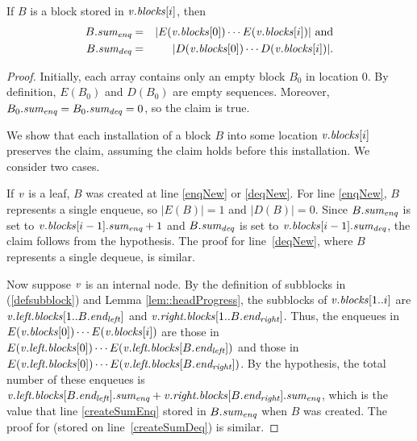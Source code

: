 \begin{invariant}
\label{inv::sum}
If $B$ is a block stored in $\var{v}.\fld{blocks}[i]$, then
\begin{eqnarray*}
B.\fld{sum\sub{enq}} &=& | E(\var{v}.\fld{blocks}[0])\cdots E(\var{v}.\fld{blocks}[i]) | \mbox{ and}\\
B.\fld{sum\sub{deq}} &=& | D(\var{v}.\fld{blocks}[0])\cdots D(\var{v}.\fld{blocks}[i]) |.
\end{eqnarray*}
\end{invariant}

\begin{proof}
Initially, each  array  contains only an empty block $B_0$ in location 0.
By definition, $E(B_0)$ and $D(B_0)$ are empty sequences.
Moreover, $B_0.\fld{sum\sub{enq}} = B_0.\fld{sum\sub{deq}} = 0$, so the claim is true.

We show that each installation of a block $B$ into some location $\var{v}.\fld{blocks}[i]$ preserves the claim,
assuming the claim holds before this installation.  We consider two cases.

If $\var{v}$ is a leaf, $B$ was created at line \ref{enqNew} or \ref{deqNew}.
For line \ref{enqNew}, $B$ represents a single enqueue, so $|E(B)|=1$ and $|D(B)|=0$.
Since $B.\fld{sum\sub{enq}}$ is set to $\var{v}.\fld{blocks}[i-1].\fld{sum\sub{enq}}+1$ and
$B.\fld{sum\sub{deq}}$ is set to $\var{v}.\fld{blocks}[i-1].\fld{sum\sub{deq}}$, the claim follows from the hypothesis.
The proof for line~\ref{deqNew}, where $B$ represents a single dequeue, is similar.

Now suppose $\var{v}$ is an internal node. By the definition of  subblocks in (\ref{defsubblock}) and Lemma \ref{lem::headProgress}, the 
subblocks of $\var{v}.\fld{blocks}[1..i]$ are $\var{v}.\fld{left.blocks}[1..B.\eleft]$ 
and $\var{v}.\fld{right.blocks}[1..B.\eright]$.
Thus, the enqueues in $E(\var{v}.\fld{blocks}[0])\cdots E(\var{v}.\fld{blocks}[i])$ are those in
$E(\var{v}.\fld{left.blocks}[0]) \cdots E(\var{v}.\fld{left.blocks}[B.\eleft])$ and those in 
$E(\var{v}.\fld{left.blocks}[0]) \cdots E(\var{v}.\fld{left.blocks}[B.\eright])$.
By the hypothesis, the total number of these enqueues is 
$\var{v}.\fld{left.blocks}[B.\eleft].\fld{sum\sub{enq}} + \var{v}.\fld{right.blocks}[B.\eright].\fld{sum\sub{enq}}$, 
which is the value that line \ref{createSumEnq} stored in $B.\fld{sum\sub{enq}}$ when $B$ was created.
The proof for  (stored on line~\ref{createSumDeq}) is similar.
\end{proof}

